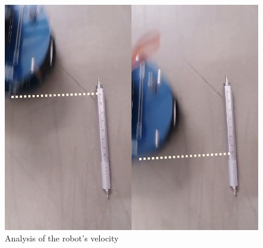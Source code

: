 \documentclass[conference]{IEEEtran}
\begin{document}
\begin{figure}[h]
    \centering
    \includegraphics[width=\linewidth]{img/frames.png}
    \caption{Analysis of the robot's velocity}
    \label{fig:frames}
\end{figure}
\end{document}
